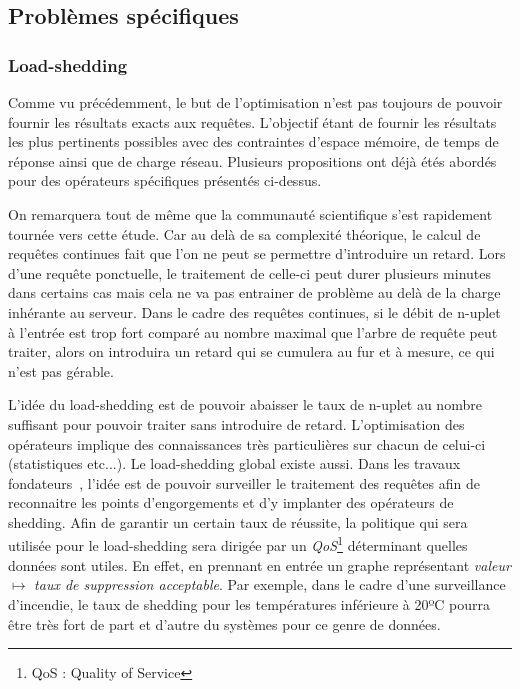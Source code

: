 \subsection{Problèmes spécifiques}
\subsubsection{Load-shedding}
Comme vu précédemment, le but de l'optimisation n'est pas toujours de pouvoir fournir les résultats exacts aux requêtes. L'objectif étant de fournir les résultats les plus pertinents possibles avec des contraintes d'espace mémoire, de temps de réponse ainsi que de charge réseau. Plusieurs propositions ont déjà étés abordés pour des opérateurs  spécifiques présentés ci-dessus. 

On remarquera tout de même que la communauté scientifique s'est rapidement tournée vers cette étude. Car au delà de sa complexité théorique, le calcul de requêtes continues fait que l'on ne peut se permettre d'introduire un retard. Lors d'une requête ponctuelle, le traitement de celle-ci peut durer plusieurs minutes dans certains cas mais cela ne va pas entrainer de problème au delà de la charge inhérante au serveur. Dans le cadre des requêtes continues, si le débit de n-uplet à l'entrée est trop fort comparé au nombre maximal que l'arbre de requête peut traiter, alors on introduira un retard qui se cumulera au fur et à mesure, ce qui n'est pas gérable.

L'idée du load-shedding est de pouvoir abaisser le taux de n-uplet au nombre suffisant pour pouvoir traiter sans introduire de retard. L'optimisation des opérateurs implique des connaissances très particulières sur chacun de celui-ci (statistiques etc...). Le load-shedding global existe aussi. Dans les travaux fondateurs~\cite{Tatbul:window,Tatbul:load-shedding}, l'idée est de pouvoir surveiller le traitement des requêtes afin de reconnaitre les points d'engorgements et d'y implanter des opérateurs de shedding. Afin de garantir un certain taux de réussite, la politique qui sera utilisée pour le load-shedding sera dirigée par un \textit{QoS}\footnote{QoS : Quality of Service} déterminant quelles données sont utiles. En effet, en prennant en entrée un graphe représentant \textit{valeur} $\mapsto$  \textit{taux de suppression acceptable}. Par exemple, dans le cadre d'une surveillance d'incendie, le taux de shedding pour les températures inférieure à 20ºC pourra être très fort de part et d'autre du systèmes pour ce genre de données.

